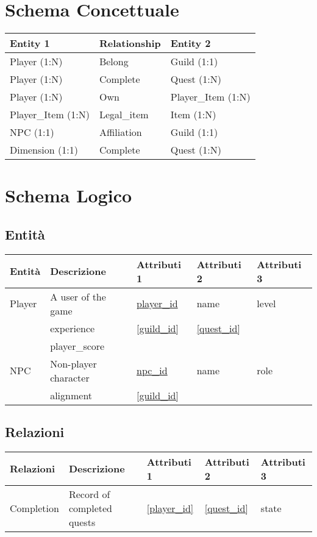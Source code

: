 \documentclass{article}%
\begin{document}
%
\section{Schema Concettuale}%
\label{sec:SchemaConcettuale}%
\begin{tabularx}{\textwidth}{|l|l|l|}%
\hline%
\textbf{Entity 1}&\textbf{Relationship}&\textbf{Entity 2}\\%
\hline%
Player (1:N)&Belong&Guild (1:1)\\%
\hline%
Player (1:N)&Complete&Quest (1:N)\\%
\hline%
Player (1:N)&Own&Player\_Item (1:N)\\%
\hline%
Player\_Item (1:N)&Legal\_item&Item (1:N)\\%
\hline%
NPC (1:1)&Affiliation&Guild (1:1)\\%
\hline%
Dimension (1:1)&Complete&Quest (1:N)\\%
\hline%
\end{tabularx}

%
\section{Schema Logico}%
\label{sec:SchemaLogico}%
\subsection{Entità}%
\label{subsec:Entit}%
\begin{longtable}{|l|l|l|l|l|}%
\hline%
\textbf{Entità}&\textbf{Descrizione}&\textbf{Attributi 1}&\textbf{Attributi 2}&\textbf{Attributi 3}\\%
\hline%
Player&A user of the game&\underline{player\_id}&name&level\\%
&experience&\underline{[guild\_id]}&\underline{[quest\_id]}&\\%
&player\_score&&&\\%
\hline%
NPC&Non{-}player character&\underline{npc\_id}&name&role\\%
&alignment&\underline{[guild\_id]}&&\\%
\hline%
\end{longtable}

%
\subsection{Relazioni}%
\label{subsec:Relazioni}%
\begin{longtable}{|l|l|l|l|l|}%
\hline%
\textbf{Relazioni}&\textbf{Descrizione}&\textbf{Attributi 1}&\textbf{Attributi 2}&\textbf{Attributi 3}\\%
\hline%
Completion&Record of completed quests&\underline{[player\_id]}&\underline{[quest\_id]}&state\\%
\hline%
\end{longtable}
\end{document}
